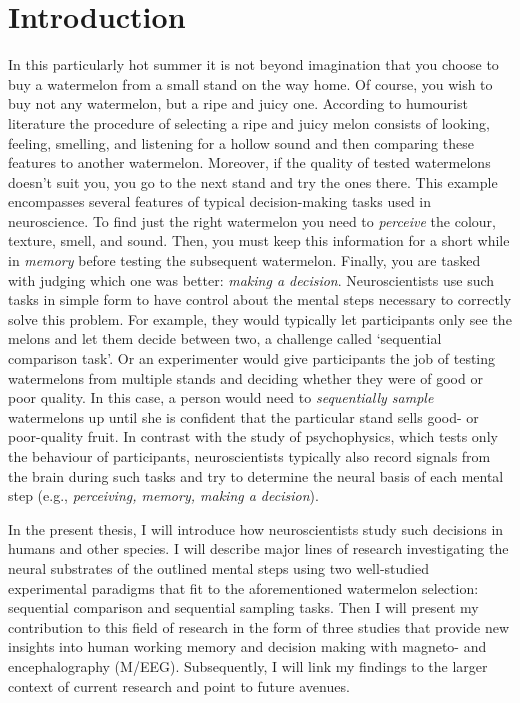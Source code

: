 
\chapter{Introduction}

\label{ch:Introduction}
In this particularly hot summer it is not beyond imagination that you choose to buy a watermelon from a small stand on the way home. Of course, you wish to buy not any watermelon, but a ripe and juicy one. According to humourist literature \parencite["fixating the melon's secret",][]{Kishon1975} the procedure of selecting a ripe and juicy melon consists of looking, feeling, smelling, and listening for a hollow sound and then comparing these features to another watermelon. Moreover, if the quality of tested watermelons doesn’t suit you, you go to the next stand and try the ones there. This example encompasses several features of typical decision-making tasks used in neuroscience. To find just the right watermelon you need to \textit{perceive} the colour, texture, smell, and sound. Then, you must keep this information for a short while in \textit{memory} before testing the subsequent watermelon. Finally, you are tasked with judging which one was better: \textit{making a decision}. Neuroscientists use such tasks in simple form to have control about the mental steps necessary to correctly solve this problem. For example, they would typically let participants only see the melons and let them decide between two, a challenge called ‘sequential comparison task’. Or an experimenter would give participants the job of testing watermelons from multiple stands and deciding whether they were of good or poor quality. In this case, a person would need to \textit{sequentially sample} watermelons up until she is confident that the particular stand sells good- or poor-quality fruit. In contrast with the study of psychophysics, which tests only the behaviour of participants, neuroscientists typically also record signals from the brain during such tasks and try to determine the neural basis of each mental step (e.g., \textit{perceiving, memory, making a decision}). 

In the present thesis, I will introduce how neuroscientists study such decisions in humans and other species. I will describe major lines of research investigating the neural substrates of the outlined mental steps using two well-studied experimental paradigms that fit to the aforementioned watermelon selection: sequential comparison and sequential sampling tasks. Then I will present my contribution to this field of research in the form of three studies that provide new insights into human working memory and decision making with magneto- and encephalography (M/EEG). Subsequently, I will link my findings to the larger context of current research and point to future avenues. 

